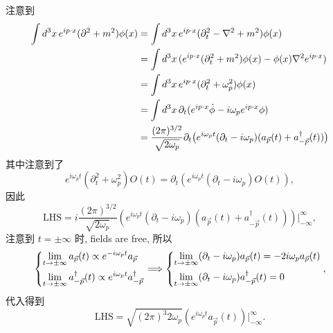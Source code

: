 \begin{itemize}
	\begin{tcolorbox}[title=proof:]
		注意到
		\begin{align}
			\int d^3 x \, e^{i p \cdot x} (\partial^2 + m^2) \phi(x) &= \int d^3 x \, e^{i p \cdot x} (\partial_t^2 - \nabla^2 + m^2) \phi(x) \notag \\
			&= \int d^3 x \, (e^{i p \cdot x} (\partial_t^2 + m^2) \phi(x) - \phi(x) \nabla^2 e^{i p \cdot x}) \notag \\
			&= \int d^3 x \, e^{i p \cdot x} (\partial_t^2 + \omega_p^2) \phi(x) \notag \\
			&= \int d^3 x \, \partial_t(e^{i p \cdot x} \dot{\phi} - i \omega_p e^{i p \cdot x} \phi) \\
			&= \frac{(2 \pi)^{3 / 2}}{\sqrt{2 \omega_p}} \partial_t \big( e^{i \omega_p t} (\partial_t - i \omega_p) (a_{\vec{p}}(t) + a^\dag_{- \vec{p}}(t)) \big)
		\end{align}
		其中注意到了
		\begin{equation}
			e^{i \omega_p t} (\partial_t^2 + \omega_p^2) O(t) = \partial_t(e^{i \omega_p t} (\partial_t - i \omega_p) O(t)),
		\end{equation}
		因此
		\begin{equation}
			\text{LHS} = i \frac{(2 \pi)^{3 / 2}}{\sqrt{2 \omega_p}} (e^{i \omega_p t} (\partial_t - i \omega_p) (a_{\vec{p}}(t) + a^\dag_{- \vec{p}}(t))) \Big|^\infty_{- \infty},
		\end{equation}
		注意到 $t = \pm \infty$ 时, fields are free, 所以
		\begin{equation} \label{the S-matrix and time-ordered products.1.9}
			\begin{dcases}
				\lim_{t \rightarrow \pm \infty} a_{\vec{p}}(t) \propto e^{- i \omega_p t} a_{\vec{p}} \\
				\lim_{t \rightarrow \pm \infty} a^\dag_{- \vec{p}}(t) \propto e^{i \omega_p t} a^\dag_{- \vec{p}}
			\end{dcases} \Longrightarrow \begin{dcases}
				\lim_{t \rightarrow \pm \infty} (\partial_t - i \omega_p) a_{\vec{p}}(t) = - 2 i \omega_p a_{\vec{p}}(t) \\
				\lim_{t \rightarrow \pm \infty} (\partial_t - i \omega_p) a^\dag_{- \vec{p}}(t) = 0
			\end{dcases},
		\end{equation}
		代入得到
		\begin{equation}
			\text{LHS} = \sqrt{(2 \pi)^3 2 \omega_p} (e^{i \omega_p t} a_{\vec{p}}(t)) \Big|^\infty_{- \infty}.
		\end{equation}
	\end{tcolorbox}
	

\end{itemize}
